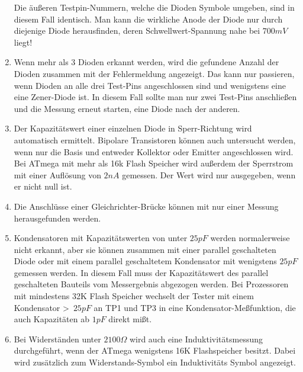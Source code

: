 \begin{enumerate}
Die äußeren Testpin-Nummern, welche die Dioden Symbole umgeben, sind in diesem Fall identisch.
Man kann die wirkliche Anode der Diode nur durch diejenige Diode herausfinden, deren Schwellwert-Spannung nahe bei \(700mV\) liegt!
\item Wenn mehr als 3 Dioden erkannt werden, wird die gefundene Anzahl der Dioden zusammen mit der Fehlermeldung angezeigt.
Das kann nur passieren, wenn Dioden an alle drei Test-Pins angeschlossen sind und wenigstens eine eine Zener-Diode ist.
In diesem Fall sollte man nur zwei Test-Pins anschließen und die Messung erneut starten, eine Diode nach der anderen.
\item Der Kapazitätswert einer einzelnen Diode in Sperr-Richtung wird automatisch ermittelt.
Bipolare Transistoren können auch untersucht werden, wenn nur die Basis und entweder Kollektor oder Emitter angeschlossen wird.
Bei ATmega mit mehr als 16k Flash Speicher wird außerdem der Sperrstrom mit einer Auflösung von \(2nA\) gemessen.
Der Wert wird nur ausgegeben, wenn er nicht null ist.
\item Die Anschlüsse einer Gleichrichter-Brücke können mit nur einer Messung herausgefunden werden.
\item Kondensatoren mit Kapazitätswerten von unter \(25pF\) werden normalerweise nicht erkannt, 
aber sie können zusammen mit einer parallel geschalteten Diode oder mit einem parallel geschaltetem Kondensator mit
wenigstens \(25pF\) gemessen werden.
In diesem Fall muss der Kapazitätswert des parallel geschalteten Bauteils vom Messergebnis abgezogen werden.
Bei Prozessoren mit mindestens 32K Flash Speicher wechselt der Tester mit einem Kondensator \textgreater~\(25pF\)
an TP1 und TP3 in eine Kondensator-Meßfunktion, die auch Kapazitäten ab \(1pF\) direkt mißt.
\item Bei Widerständen unter \(2100\Omega\) wird auch eine Induktivitätsmessung durchgeführt, wenn der
ATmega wenigstens 16K Flashspeicher besitzt.
Dabei wird zusätzlich zum Widerstands-Symbol \mbox{\electricR} ein Induktivitäts Symbol \mbox{\electricL} angezeigt.


\end{enumerate}
